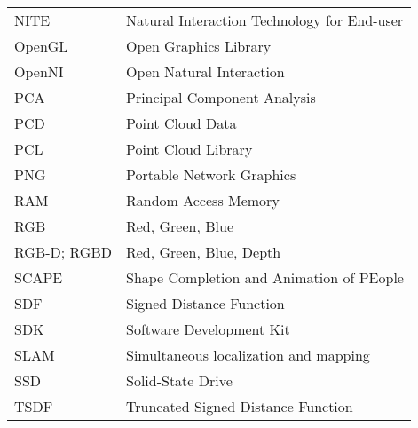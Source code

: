 \begin{longtable}{@{}p{}p{}@{}}
       NITE & Natural Interaction Technology for End-user \\
     OpenGL & Open Graphics Library \\
     OpenNI & Open Natural Interaction \\
        PCA & Principal Component Analysis \\
        PCD & Point Cloud Data \\
        PCL & Point Cloud Library \\
        PNG & Portable Network Graphics \\
        RAM & Random Access Memory \\
        RGB & Red, Green, Blue \\
RGB-D; RGBD & Red, Green, Blue, Depth \\
      SCAPE & Shape Completion and Animation of PEople \\
        SDF & Signed Distance Function \\
        SDK & Software Development Kit \\
       SLAM & Simultaneous localization and mapping \\
        SSD & Solid-State Drive \\
       TSDF & Truncated Signed Distance Function \\
\end{longtable}

